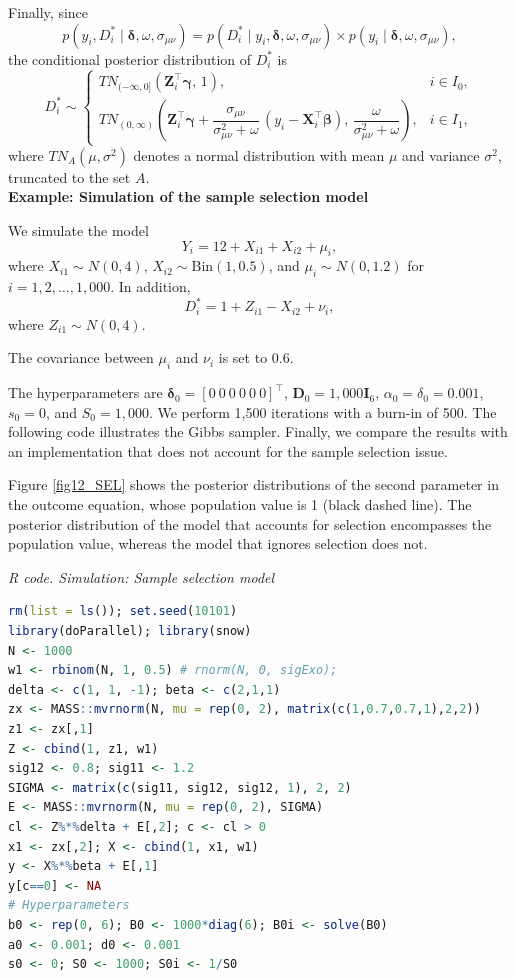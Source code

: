 Finally, since
\[
p(y_i,D_i^*\mid \boldsymbol{\delta},\omega,\sigma_{\mu\nu})
= p(D_i^*\mid y_i, \boldsymbol{\delta},\omega,\sigma_{\mu\nu})
\times p(y_i\mid \boldsymbol{\delta},\omega,\sigma_{\mu\nu}),
\]
the conditional posterior distribution of $D_i^*$ is
\[
D_i^* \sim 
\begin{cases}
	TN_{(-\infty,0]}(\mathbf{Z}_i^{\top}\boldsymbol{\gamma},\,1), & i\in I_0,\\[6pt]
	TN_{(0,\infty)}\!\left(\mathbf{Z}_i^{\top}\boldsymbol{\gamma}
	+\dfrac{\sigma_{\mu\nu}}{\sigma_{\mu\nu}^2+\omega}\,(y_i-\mathbf{X}_i^{\top}\boldsymbol{\beta}),\,
	\dfrac{\omega}{\sigma_{\mu\nu}^2+\omega}\right), & i\in I_1,
\end{cases}
\]
where $TN_{A}(\mu,\sigma^2)$ denotes a normal distribution with mean $\mu$ and variance $\sigma^2$, truncated to the set $A$.\\

\textbf{Example: Simulation of the sample selection model}

We simulate the model 
\[
Y_i = 12 + X_{i1} + X_{i2} + \mu_i,
\]
where $X_{i1}\sim N(0,4)$, $X_{i2}\sim \text{Bin}(1,0.5)$, and $\mu_i\sim N(0,1.2)$ for $i=1,2,\dots,1,000$.  
In addition, 
\[
D_i^* = 1 + Z_{i1} - X_{i2} + \nu_i,
\]
where $Z_{i1}\sim N(0,4)$.

The covariance between $\mu_i$ and $\nu_i$ is set to $0.6$.

The hyperparameters are $\boldsymbol{\delta}_0=[0 \ 0 \ 0 \ 0 \ 0 \ 0]^{\top}$, $\mathbf{D}_0=1,000\mathbf{I}_6$, $\alpha_0=\delta_0=0.001$, $s_0=0$, and $S_0=1,000$. We perform 1,500 iterations with a burn-in of 500. The following code illustrates the Gibbs sampler. Finally, we compare the results with an implementation that does not account for the sample selection issue.

Figure \ref{fig12_SEL} shows the posterior distributions of the second parameter in the outcome equation, whose population value is 1 (black dashed line). The posterior distribution of the model that accounts for selection encompasses the population value, whereas the model that ignores selection does not.

\begin{tcolorbox}[enhanced,width=4.67in,center upper,
	fontupper=\large\bfseries,drop shadow southwest,sharp corners]
	\textit{R code. Simulation: Sample selection model}
	\begin{VF}
		\begin{lstlisting}[language=R]	
rm(list = ls()); set.seed(10101)
library(doParallel); library(snow)
N <- 1000
w1 <- rbinom(N, 1, 0.5) # rnorm(N, 0, sigExo); 
delta <- c(1, 1, -1); beta <- c(2,1,1)
zx <- MASS::mvrnorm(N, mu = rep(0, 2), matrix(c(1,0.7,0.7,1),2,2))
z1 <- zx[,1]
Z <- cbind(1, z1, w1)
sig12 <- 0.8; sig11 <- 1.2
SIGMA <- matrix(c(sig11, sig12, sig12, 1), 2, 2)
E <- MASS::mvrnorm(N, mu = rep(0, 2), SIGMA)
cl <- Z%*%delta + E[,2]; c <- cl > 0
x1 <- zx[,2]; X <- cbind(1, x1, w1)
y <- X%*%beta + E[,1]
y[c==0] <- NA
# Hyperparameters
b0 <- rep(0, 6); B0 <- 1000*diag(6); B0i <- solve(B0)
a0 <- 0.001; d0 <- 0.001
s0 <- 0; S0 <- 1000; S0i <- 1/S0
\end{lstlisting}
\end{VF}
\end{tcolorbox}  

